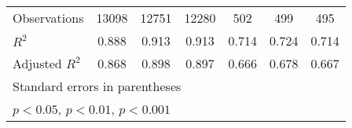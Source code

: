 {\begin{tabular}{l*{6}{c}}
\hline
Observations        &       13098         &       12751         &       12280         &         502         &         499         &         495         \\
\(R^{2}\)           &       0.888         &       0.913         &       0.913         &       0.714         &       0.724         &       0.714         \\
Adjusted \(R^{2}\)  &       0.868         &       0.898         &       0.897         &       0.666         &       0.678         &       0.667         \\
\hline\hline
\multicolumn{7}{l}{\footnotesize Standard errors in parentheses}\\
\multicolumn{7}{l}{\footnotesize \sym{*} \(p<0.05\), \sym{**} \(p<0.01\), \sym{***} \(p<0.001\)}\\
\end{tabular}
}

